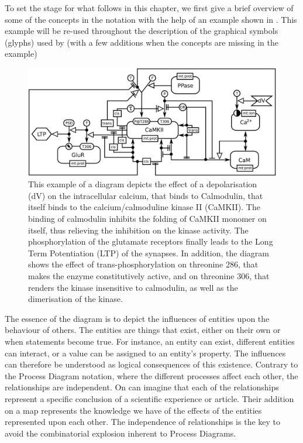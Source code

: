 
To set the stage for what follows in this chapter, we first give a brief overview of some of the concepts in the \ER notation with the help of an example shown in . This example will be re-used throughout the description of the graphical symbols (glyphs) used by \SBGNERLone (with a few additions when the concepts are missing in the example) 

\begin{figure}[H]
  \centering
  \vspace*{-0.75em}
  \includegraphics[scale=0.45]{examples/CaMKII-intro-new}
   \caption{This example of a \ER diagram depicts the effect of a depolarisation (dV) on the intracellular calcium, that binds to Calmodulin, that itself binds to the calcium/calmoduline kinase II (CaMKII). The binding of calmodulin inhibits the folding of CaMKII monomer on itself, thus relieving the inhibition on the kinase activity. The phosphorylation of the glutamate receptors finally leads to the Long Term Potentiation (LTP) of the synapses. In addition, the diagram shows the effect of trans-phosphorylation on threonine 286, that makes the enzyme constitutively active, and on threonine 306, that renders the kinase insensitive to calmodulin, as well as the dimerisation of the kinase.}
  \label{fig:eg1}
\end{figure}
 
The essence of the \ER diagram is to depict the influences of entities upon the behaviour of others. The entities are things that exist, either on their own or when statements become true. For instance, an entity can exist, different entities can interact, or a value can be assigned to an entity's property. The influences can therefore be understood as logical consequences of this existence. Contrary to the Process Diagram notation, where the different processes affect each other, the relationships are independent. On can imagine that each of the relationships represent a specific conclusion of a scientific experience or article. Their addition on a map represents the knowledge we have of the effects of the entities represented upon each other. The independence of relationships is the key to avoid the combinatorial explosion inherent to Process Diagrams.

